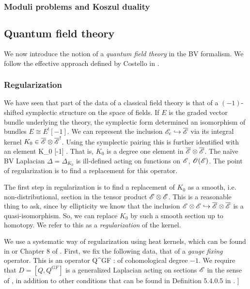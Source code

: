 
\subsubsection{Moduli problems and Koszul duality}


\subsection{Quantum field theory}

We now introduce the notion of a {\em quantum field theory} in the BV formalism.
We follow the effective approach defined by Costello in \cite{CostelloRenormalization}.

\subsubsection{Regularization}

We have seen that part of the data of a classical field theory is that of a $(-1)$-shifted symplectic structure on the space of fields. 
If $E$ is the graded vector bundle underlying the theory, the symplectic form determined an isomorphism of bundles $E \cong E^![-1]$. 
We can represent the inclusion $\mathscr E_c \hookrightarrow \overline{\mathscr E}$ via its integral kernel $K_0 \in \overline{\mathscr E} \otimes \overline{\mathscr E}^!$. 
Using the symplectic pairing this is further identified with an element 
\ben
K_0 \in \Bar{\sE} \tensor \Bar{\sE} [-1] .
\een
That is, $K_0$ is a degree one element in $\overline{\mathscr E} \otimes \overline{\mathscr E}$.
The na\"{i}ve BV Laplacian $\Delta = \Delta_{K_0}$ is ill-defined acting on functions on $\mathscr E$, $\mathscr O(\mathscr E)$. 
The point of regularization is to find a replacement for this operator.

The first step in regularization is to find a replacement of $K_0$ as a smooth, i.e. non-distributional, section in the tensor product $\mathscr E \otimes \mathscr E$. 
This is a reasonable thing to ask, since by ellipticity we know that the inclusion $\mathscr E \otimes \mathscr E \hookrightarrow \overline{\mathscr E} \otimes \overline{\mathscr E}$ is a quasi-isomorphism. 
So, we can replace $K_0$ by such a smooth section up to homotopy.
We refer to this as a {\em regularization} of the kernel.

We use a systematic way of regularization using heat kernels, which can be found in \cite{CostelloRenormalization} or Chapter 8 of \cite{CG2}. 
First, we fix the following data, that of a {\em gauge fixing} operator.
This is an operator 
\ben
Q^{GF} : \sE \to \sE[-1]
\een 
of cohomological degree $-1$.
We require that $D = [Q,Q^{GF}]$ is a generalized Laplacian acting on sections $\mathscr E$ in the sense of \cite{GetzlerDirac}, in addition to other conditions that can be found in Definition 5.4.0.5 in \cite{CG2}. ]

